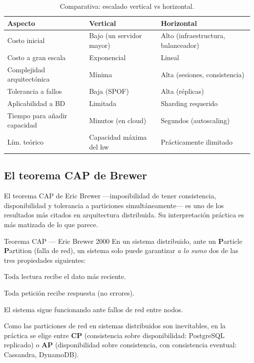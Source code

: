 \documentclass[11pt,a4paper,openany]{book}
\begin{document}
\begin{table}[htbp]
\centering
\caption{Comparativa: escalado vertical vs horizontal.}
\footnotesize
\begin{tabularx}{\textwidth}{lXX}
\toprule
\textbf{Aspecto} & \textbf{Vertical} & \textbf{Horizontal}\\
\midrule
Costo inicial & Bajo (un servidor mayor) & Alto (infraestructura, balanceador)\\
Costo a gran escala & Exponencial & Lineal\\
Complejidad arquitectónica & Mínima & Alta (sesiones, consistencia)\\
Tolerancia a fallos & Baja (SPOF) & Alta (réplicas)\\
Aplicabilidad a BD & Limitada & Sharding requerido\\
Tiempo para añadir capacidad & Minutos (en cloud) & Segundos (autoscaling)\\
Lím. teórico & Capacidad máxima del hw & Prácticamente ilimitado\\
\bottomrule
\end{tabularx}
\end{table}

\subsection{El teorema CAP de Brewer}

El teorema CAP de Eric Brewer ---imposibilidad de tener
consistencia, disponibilidad y tolerancia a particiones
simultáneamente--- es uno de los resultados más citados en
arquitectura distribuida. Su interpretación práctica es más matizada
de lo que parece.


\begin{cajadefinicion}{Teorema CAP --- Eric Brewer 2000}
En un sistema distribuido, ante un \textbf{P}article \textbf{P}artition
(falla de red), un sistema solo puede garantizar
\emph{a lo sumo} dos de las tres propiedades siguientes:

\begin{description}[leftmargin=1.5cm]
\item[Consistency (C).] Toda lectura recibe el dato más reciente.
\item[Availability (A).] Toda petición recibe respuesta (no errores).
\item[Partition tolerance (P).] El sistema sigue funcionando ante
fallos de red entre nodos.
\end{description}

Como las particiones de red en sistemas distribuidos son inevitables,
en la práctica se elige entre \textbf{CP} (consistencia sobre
disponibilidad: PostgreSQL replicado) o \textbf{AP} (disponibilidad
sobre consistencia, con consistencia eventual: Cassandra, DynamoDB).
\end{cajadefinicion}
\end{document}
